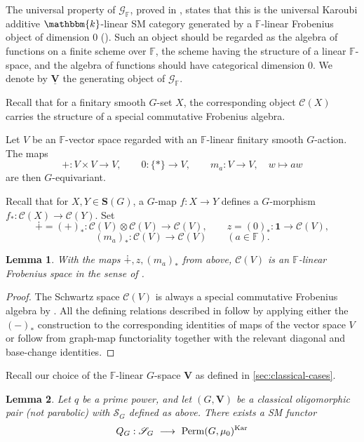 \documentclass[11pt,a4paper]{amsart}
\theoremstyle{plain}%
\newtheorem{lemma}{Lemma}[subsection]
\theoremstyle{definition}
\theoremstyle{remark}
\newcommand{\V}{\mathbf{V}}
\newcommand{\Perm}{\underline{{\rm Perm}}}
\newcommand{\F}{{\mathbb F}}
\newcommand{\kk}{\mathbbm{k}}
\newcommand{\one}{{\mathbf{1}}}
\newcommand{\Kar}{\mathrm{Kar}}
\newcommand{\cC}{\mathcal{C}}
\newcommand{\Set}[1]{\mathbf{S}(#1)}
\begin{document}
The universal property of $ \mathscr G_{\F}$, proved in \cite{EAHGL}, states that this is the universal Karoubi additive $\kk$-linear SM category generated by a $\F$-linear Frobenius object of dimension $0$ (\cite[Definition~5.1.1]{EAHGL}). Such an object should be regarded as the algebra of functions on a finite scheme over $\F$, the scheme having the structure of {a} linear $\F$-space, and the algebra of functions should have categorical dimension $0$. We denote by $\underline{\V}$ the generating object of $ \mathscr G_{\F}$.

Recall that for a finitary smooth $G$-set $X$, the corresponding object
$\cC(X)$ carries the structure of a special commutative Frobenius algebra.

Let $V$ be an $\F$-vector space regarded with an $\F$-linear finitary smooth $G$-action. The maps
\[
 +:V\times V\longrightarrow V,
 \qquad
 0:\{*\}\longrightarrow V,
 \qquad
 m_a:V\longrightarrow V,\quad w\longmapsto aw
\]
are then $G$-equivariant.

Recall that for $X, Y\in \Set{G}$, a $G$-map $f:X\to Y$ defines a $G$-morphism $f_*:\cC(X)\to \cC(Y)$. Set
\[
 \dotplus=(+)_*:
 \cC(V)\otimes\cC(V)\longrightarrow\cC(V),
 \qquad
 z=(0)_*:\one\longrightarrow\cC(V),
\]
\[
(m_a)_*:\cC(V)\longrightarrow\cC(V)
 \qquad(a\in\F).
\]



\begin{lemma}\label{lem:linear-frob}
With the maps $\dotplus,z,(m_a)_*$ from above, $\cC(V)$ is an $\F$-linear Frobenius space in the sense of \cite[Definition~5.1.1]{EAHGL}.
\end{lemma}

\begin{proof}
    The Schwartz space $\cC(V)$ is always a special commutative Frobenius algebra by \cite{HS-oligomorphic}. All the defining relations described in \cite[Definition~5.1.1]{EAHGL} follow by applying either the $(-)_*$ construction to the corresponding identities of maps of the vector space $V$ or follow from graph-map functoriality together with the relevant diagonal and base-change identities.
\end{proof}

Recall our choice of the $\F$-linear $G$-space $\V$ as defined in \cref{sec:classical-cases}.
 



\begin{lemma}\label{lem:existence_of_func_Q_G}
    Let $q$ be a prime power, and let $(G, \V)$ be a classical oligomorphic pair (not parabolic) with $ \mathscr S_G$ defined as above. There exists a SM functor
\[
 Q_G: \mathscr S_G~\longrightarrow~\mathcal \Perm(G, \mu_0)^{\Kar}
\] 

\end{lemma}
\end{document}
